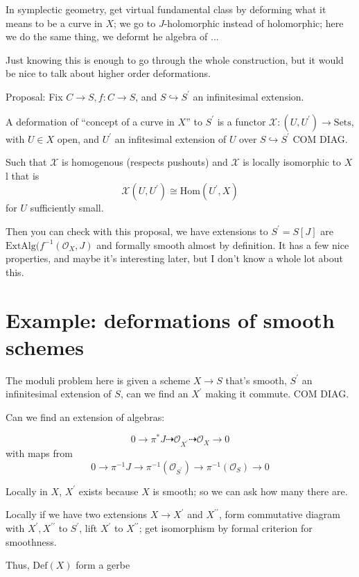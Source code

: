 \documentclass{amsart}
\theoremstyle{definition}
\newcommand{\Def}{\text{Def}}
\newcommand{\OO}{\mathcal{O}}
\newcommand{\Hom}{\text{Hom}}
\begin{document}
In symplectic geometry, get virtual fundamental class by deforming what it means to be a curve in $X$; we go to $J$-holomorphic instead of holomorphic; here we do the same thing, we deformt he algebra of ...



Just knowing this is enough to go through the whole construction, but it would be nice to talk about higher order deformations.

Proposal: Fix $C\to S, f:C\to S$, and $S\hookrightarrow S^\prime$ an infinitesimal extension.

A deformation of ``concept of a curve in $X$'' to $S^\prime$ is a functor $\mathcal{X}:(U, U^\prime)\to\text{Sets}$, with $U\in X$ open, and $U^\prime$ an infitesimal extension of $U$ over $S\hookrightarrow S^\prime$ COM DIAG.

Such that $\mathcal{X}$ is homogenous (respects pushouts) and $\mathcal{X}$ is locally isomorphic to $X$l that is
$$\mathcal{X}(U, U^\prime)\cong \Hom(U^\prime, X)$$ for $U$ sufficiently small.

Then you can check with this proposal, we have extensions to $S^\prime=S[J]$ are $\text{ExtAlg}(f^{-1}(\OO_X, J)$
and formally smooth almost by definition.  It has a few nice properties, and maybe it's interesting later, but I don't know a whole lot about this.

\section{Example: deformations of smooth schemes}

The moduli problem here is given a scheme $X\to S$ that's smooth, $S^\prime$ an infinitesimal extension of $S$, can we find an $X^\prime$ making it commute.  COM DIAG.

Can we find an extension of algebras:

$$0\to \pi^*J\dashrightarrow \OO_{X^\prime}\dashrightarrow\OO_X\to 0$$
with maps from
$$0\to \pi^{-1} J\to \pi^{-1} (\OO_{S^\prime})\to \pi^{-1}(\OO_S)\to 0$$

Locally in $X$, $X^\prime$ exists because $X$ is smooth; so we can ask how many there are.

Locally if we have two extensions $X\to X^\prime$ and $X^{\prime\prime}$, form commutative diagram with $X^\prime, X^{\prime\prime}$ to $S^\prime$, lift $X^\prime$ to $X^{\prime\prime}$; get isomorphism by formal criterion for smoothness.

Thus, $\Def(X)$ form a gerbe
\end{document}
